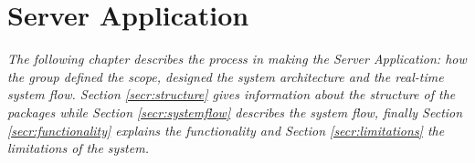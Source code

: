 \chapter{Server Application}
\textit{The following chapter describes the process in making the Server Application: how the group defined the scope, designed the system architecture and the real-time system flow. Section \ref{secr:structure} gives information about the structure of the packages while Section \ref{secr:systemflow} describes the system flow, finally Section \ref{secr:functionality} explains the functionality and Section \ref{secr:limitations} the limitations of the system.}





